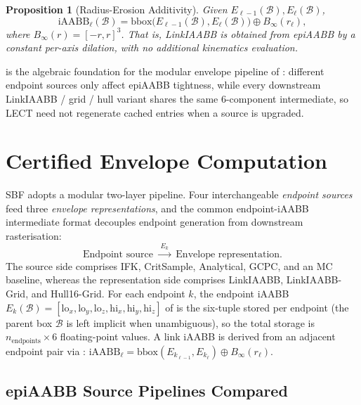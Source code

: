 \documentclass[journal]{IEEEtran}
\newtheorem{proposition}{Proposition}
\newcommand{\iAABB}{\mathrm{iAABB}}
\begin{document}
\begin{proposition}[Radius-Erosion Additivity]\label{prop:radius_lift}
Given $E_{\ell-1}(\mathcal{B}),E_\ell(\mathcal{B})$,
\begin{equation}
\iAABB_\ell(\mathcal{B})
= \mathrm{bbox}\bigl(E_{\ell-1}(\mathcal{B}),E_\ell(\mathcal{B})\bigr)
\oplus B_\infty(r_\ell),
\end{equation}
where $B_\infty(r)=[-r,r]^3$. That is, LinkIAABB is obtained from
epiAABB by a \emph{constant per-axis dilation}, with no additional
kinematics evaluation.
\end{proposition}

 is the algebraic foundation for the modular
envelope pipeline of : different endpoint sources only
affect epiAABB tightness, while every downstream LinkIAABB / grid /
hull variant shares the same 6-component intermediate, so LECT need not
regenerate cached entries when a source is upgraded.

\section{Certified Envelope Computation}\label{sec:envelope}

SBF adopts a modular two-layer pipeline. Four interchangeable
\emph{endpoint sources} feed three \emph{envelope representations}, and
the common endpoint-iAABB intermediate format decouples endpoint
generation from downstream rasterisation:
\begin{equation}\label{eq:pipeline}
  \text{Endpoint source}
  \;\xrightarrow{\;E_k\;}\;
  \text{Envelope representation}.
\end{equation}
The source side comprises IFK, CritSample, Analytical, GCPC, and an
MC baseline,
whereas the representation side comprises LinkIAABB,
LinkIAABB-Grid, and Hull16-Grid.
For each endpoint $k$, the endpoint iAABB
$E_k(\mathcal{B}) = [\mathrm{lo}_x, \mathrm{lo}_y, \mathrm{lo}_z,
\mathrm{hi}_x, \mathrm{hi}_y, \mathrm{hi}_z]$ of
 is the six-tuple stored per endpoint (the parent
box $\mathcal{B}$ is left implicit when unambiguous), so the total
storage is $n_{\text{endpoints}} \times 6$ floating-point values. A
link iAABB is derived from an adjacent endpoint pair via
:
$\iAABB_\ell = \mathrm{bbox}(E_{k_{\ell-1}}, E_{k_\ell})
\oplus B_\infty(r_\ell)$.

\subsection{epiAABB Source Pipelines Compared}\label{sec:epi_pipelines}
\end{document}
